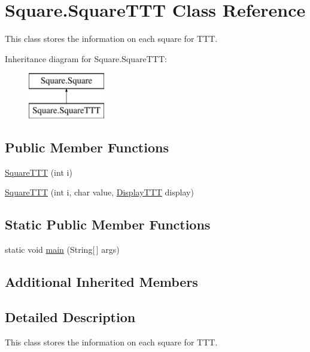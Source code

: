 \hypertarget{class_square_1_1_square_t_t_t}{}\section{Square.\+Square\+T\+T\+T Class Reference}
\label{class_square_1_1_square_t_t_t}


This class stores the information on each square for T\+T\+T.  


Inheritance diagram for Square.\+Square\+T\+T\+T\+:\begin{figure}[H]
\begin{center}
\leavevmode
\includegraphics[height=2.000000cm]{class_square_1_1_square_t_t_t}
\end{center}
\end{figure}
\subsection*{Public Member Functions}
\begin{DoxyCompactItemize}
\item 
\hyperlink{class_square_1_1_square_t_t_t_a61856539b9717c3b5a3c6f46da3bb1a2}{Square\+T\+T\+T} (int i)
\item 
\hyperlink{class_square_1_1_square_t_t_t_aa369a31f4b3520bbbb7db02d31a11139}{Square\+T\+T\+T} (int i, char value, \hyperlink{class_display_1_1_display_t_t_t}{Display\+T\+T\+T} display)
\end{DoxyCompactItemize}
\subsection*{Static Public Member Functions}
\begin{DoxyCompactItemize}
\item 
static void \hyperlink{class_square_1_1_square_t_t_t_ad094b8dd8700576e4323fd69773dd6e9}{main} (String\mbox{[}$\,$\mbox{]} args)
\end{DoxyCompactItemize}
\subsection*{Additional Inherited Members}


\subsection{Detailed Description}
This class stores the information on each square for T\+T\+T. 

